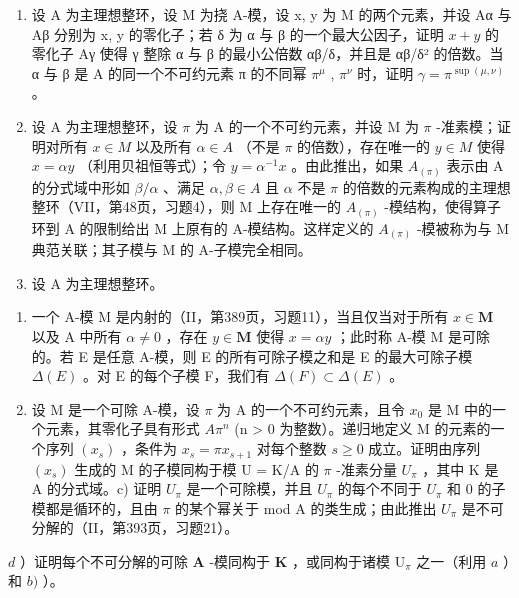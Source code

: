 \BourbakiExerciseGroup

\begin{enumerate}
\def\labelenumi{\arabic{enumi})}
\item
  设 A 为主理想整环，设 M 为挠 A-模，设 x, y 为 M 的两个元素，并设 Aα 与 Aβ 分别为 x, y 的零化子；若 δ 为 α 与 β 的一个最大公因子，证明 \(x + y\) 的零化子 Aγ 使得 γ 整除 α 与 β 的最小公倍数 αβ/δ，并且是 αβ/δ² 的倍数。当 α 与 β 是 A 的同一个不可约元素 π 的不同幂 \(\pi^{\mu}\) , \(\pi^{\nu}\) 时，证明 \(\gamma = \pi^{\sup(\mu, \nu)}\) 。
\item
  设 A 为主理想整环，设 \(\pi\) 为 A 的一个不可约元素，并设 M 为 \(\pi\) -准素模；证明对所有 \(x \in M\) 以及所有 \(\alpha \in A\) （不是 \(\pi\) 的倍数），存在唯一的 \(y \in M\) 使得 \(x = \alpha y\) （利用贝祖恒等式）；令 \(y = \alpha^{-1}x\) 。由此推出，如果 \(A_{(\pi)}\) 表示由 A 的分式域中形如 \(\beta/\alpha\) 、满足 \(\alpha, \beta \in A\) 且 \(\alpha\) 不是 \(\pi\) 的倍数的元素构成的主理想整环（VII，第48页，习题4），则 M 上存在唯一的 \(A_{(\pi)}\) -模结构，使得算子环到 A 的限制给出 M 上原有的 A-模结构。这样定义的 \(A_{(\pi)}\) -模被称为与 M 典范关联；其子模与 M 的 A-子模完全相同。
\item
  设 A 为主理想整环。
\end{enumerate}

\begin{enumerate}
\def\labelenumi{\alph{enumi})}
\item
  一个 A-模 M 是内射的（II，第389页，习题11），当且仅当对于所有 \(x \in \mathbf{M}\) 以及 A 中所有 \(\alpha \neq 0\) ，存在 \(y \in \mathbf{M}\) 使得 \(x = \alpha y\) ；此时称 A-模 M 是可除的。若 E 是任意 A-模，则 E 的所有可除子模之和是 E 的最大可除子模 \(\Delta(E)\) 。对 E 的每个子模 F，我们有 \(\Delta(F) \subset \Delta(E)\) 。
\item
  设 M 是一个可除 A-模，设 \(\pi\) 为 A 的一个不可约元素，且令 \(x_{0}\) 是 M 中的一个元素，其零化子具有形式 \(A\pi^{n}\) (n \textgreater{} 0 为整数）。递归地定义 M 的元素的一个序列 \((x_{s})\) ，条件为 \(x_{s} = \pi x_{s+1}\) 对每个整数 \(s \geqslant 0\) 成立。证明由序列 \((x_{s})\) 生成的 M 的子模同构于模 U = K/A 的 \(\pi\) -准素分量 \(U_{\pi}\) ，其中 K 是 A 的分式域。c) 证明 \(U_{\pi}\) 是一个可除模，并且 \(U_{\pi}\) 的每个不同于 \(U_{\pi}\) 和 0 的子模都是循环的，且由 \(\pi\) 的某个幂关于 mod A 的类生成；由此推出 \(U_{\pi}\) 是不可分解的（II，第393页，习题21）。
\end{enumerate}

\(d\) ）证明每个不可分解的可除 \(\mathbf{A}\) -模同构于 \(\mathbf{K}\) ，或同构于诸模 \(\mathrm{U}_{\pi}\) 之一（利用 \(a\) ）和 \(b)\) ）。

